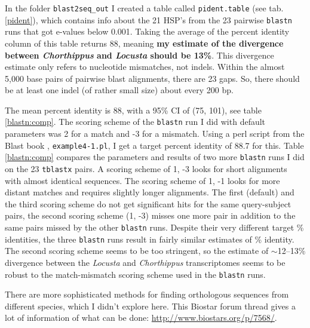 \documentclass{article}\usepackage[]{graphicx}\usepackage[]{color}
\begin{document}
In the folder \texttt{blast2seq\_out} I created a table called \texttt{pident.table} (see tab. \ref{pident}), which contains info about the 21 HSP's from the 23 pairwise \texttt{blastn} runs that got e-values below 0.001. Taking the average of the percent identity column of this table returns 88, meaning \textbf{my estimate of the divergence between \textit{Chorthippus} and \textit{Locusta} should be 13\%}. This divergence estimate only refers to nucleotide mismatches, not indels. Within the almost 5,000 base pairs of pairwise blast alignments, there are 23 gaps. So, there should be at least one indel (of rather small size) about every 200 bp.

The mean percent identity is 88, with a 95\% CI of (75, 101), see table \ref{blastn:comp}. The scoring scheme of the \texttt{blastn} run I did with default parameters was 2 for a match and -3 for a mismatch. Using a perl script from the Blast book \citep{Korf2003}, \texttt{example4-1.pl}, I get a target percent identity of 88.7 for this. Table \ref{blastn:comp} compares the parameters and results of two more \texttt{blastn} runs I did on the 23 \texttt{tblastx} pairs. A scoring scheme of 1, -3 looks for short alignments with almost identical sequences. The scoring scheme of 1, -1 looks for more distant matches and requires slightly longer alignments. The first (default) and the third scoring scheme do not get significant hits for the same query-subject pairs, the second scoring scheme (1, -3) misses one more pair in addition to the same pairs missed by the other \texttt{blastn} runs. Despite their very different \textsf{target \% identities}, the three \texttt{blastn} runs result in fairly similar estimates of \% identity. The second scoring scheme seems to be too stringent, so the estimate of $\sim$12--13\% divergence between the \textit{Locusta} and \textit{Chorthippus} transcriptomes seems to be robust to the match-mismatch scoring scheme used in the \texttt{blastn} runs.

There are more sophisticated methods for finding orthologous sequences from different species, which I didn't explore here. This Biostar forum thread gives a lot of information of what can be done: \url{http://www.biostars.org/p/7568/}.

\end{document}
